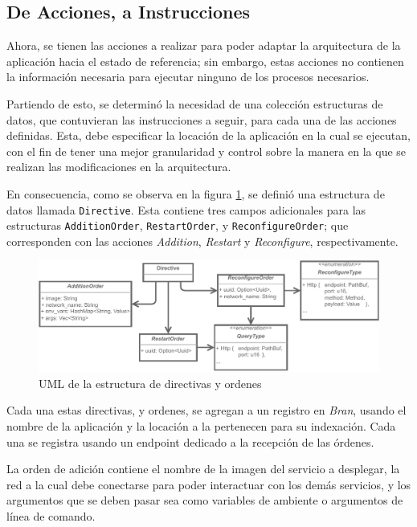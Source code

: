 \subsection{De Acciones, a Instrucciones}

Ahora, se tienen las acciones a realizar para poder adaptar la arquitectura de la aplicación hacia el estado de referencia; sin embargo, estas acciones no contienen la información necesaria para ejecutar ninguno de los procesos necesarios.

Partiendo de esto, se determinó la necesidad de una colección estructuras de datos, que contuvieran las instrucciones a seguir, para cada una de las acciones definidas. Esta, debe especificar la locación de la aplicación en la cual se ejecutan, con el fin de tener una mejor granularidad y control sobre la manera en la que se realizan las modificaciones en la arquitectura.

En consecuencia, como se observa en la figura \ref{fig:Directives}, se definió una estructura de datos llamada \texttt{Directive}. Esta contiene tres campos adicionales para las estructuras \texttt{AdditionOrder}, \texttt{RestartOrder}, y \texttt{ReconfigureOrder}; que corresponden con las acciones \textit{Addition}, \textit{Restart} y \textit{Reconfigure}, respectivamente.

\begin{figure}[ht]
    \centering
    \caption{UML de la estructura de directivas y ordenes}
    \label{fig:Directives}
    \includegraphics[width=0.85\linewidth]{images/Directives.pdf}
\end{figure}

Cada una estas directivas, y ordenes, se agregan a un registro en \textit{Bran}, usando el nombre de la aplicación y la locación a la pertenecen para su indexación. Cada una se registra usando un endpoint dedicado a la recepción de las órdenes.

La orden de adición contiene el nombre de la imagen del servicio a desplegar, la red a la cual debe conectarse para poder interactuar con los demás servicios, y los argumentos que se deben pasar sea como variables de ambiente o argumentos de línea de comando. 

